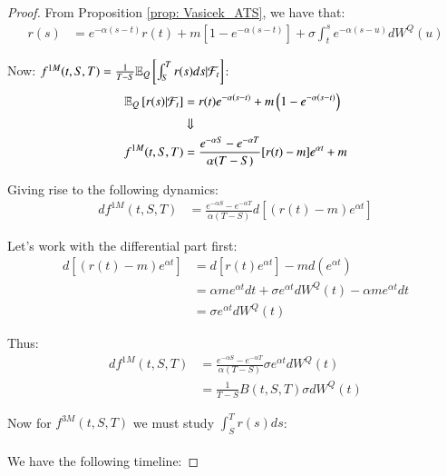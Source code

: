 \begin{proof}

From Proposition \ref{prop: Vasicek_ATS}, we have that: 
\begin{align*}
r(s) &= e^{-\alpha(s-t)}r(t) + m[1-e^{-\alpha(s-t)}] + \sigma \int_{t}^{s}e^{-\alpha(s-u)}dW^{Q}(u)
\end{align*}

Now: $f^{1M}(t,S,T) = \frac{1}{T-S}\mathbb{E}_{Q}\left[\int_{S}^{T}r(s)ds|\mathcal{F}_{t} \right]$:  
\begin{align*}
\mathbb{E}_{Q}\left[
r(s)|\mathcal{F}_{t}
\right]
&= 
r(t)e^{-\alpha(s-t)} + m\left(1-e^{-\alpha(s-t)}\right) \\ 
&\Downarrow \\ 
f^{1M}(t,S,T)
&= 
\frac{e^{-\alpha S}- e^{-\alpha T}}{\alpha(T-S)}[r(t)-m]e^{\alpha t}
+ m 
\end{align*}

Giving rise to the following dynamics: 
\begin{align*}
df^{1M}(t,S,T) 
&= 
\frac{e^{-\alpha S}- e^{-\alpha T}}
{\alpha(T-S)}
d\left[
(r(t)-m)e^{\alpha t}
\right]
\end{align*}

Let's work with the differential part first: 
\begin{align*}
d[(r(t)-m)e^{\alpha t}] &= d[r(t)e^{\alpha t}] - md(e^{\alpha t}) \\
&= \alpha me^{\alpha t}dt + \sigma e^{\alpha t}dW^{Q}(t) - \alpha me^{\alpha t}dt \\ 
&= 
\sigma e^{\alpha t}dW^{Q}(t)
\end{align*}

Thus: 
\begin{align*}
df^{1M}(t,S,T) 
&= 
\frac{e^{-\alpha S}- e^{-\alpha T}}
{\alpha(T-S)}\sigma e^{\alpha t}dW^{Q}(t) \\ 
&= \frac{1}{T-S}B(t,S,T)\sigma dW^{Q}(t)
\end{align*}

\newpage 
Now for $f^{3M}(t,S,T)$ we must study $\int_{S}^{T}r(s)ds$:  
\\~\\
We have the following timeline:

\end{proof}
